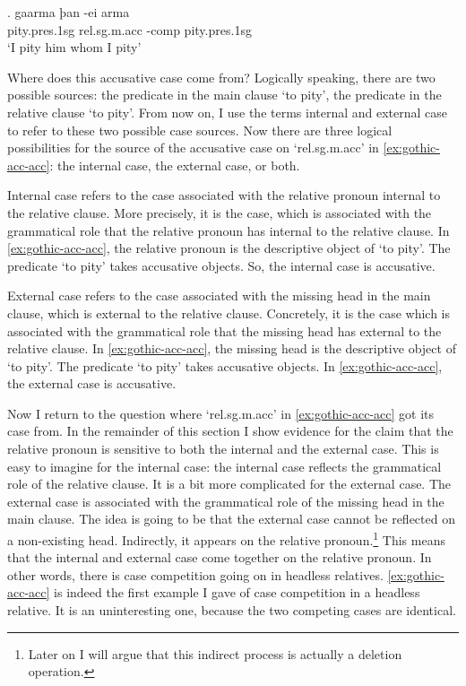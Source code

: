 \exg. gaarma þan -ei arma\\
 pity.\ac{pres}.1\ac{sg}\scsub{[acc]} \ac{rel}.\ac{sg}.\ac{m}.\ac{acc} -\ac{comp} pity.\ac{pres}.1\ac{sg}\scsub{[acc]}\\
 `I pity him whom I pity' \label{ex:gothic-acc-acc}

Where does this accusative case come from? Logically speaking, there are two possible sources: the predicate in the main clause  `to pity', the predicate in the relative clause  `to pity'. From now on, I use the terms internal and external case to refer to these two possible case sources. Now there are three logical possibilities for the source of the accusative case on  `\ac{rel}.\ac{sg}.\ac{m}.\ac{acc}' in \ref{ex:gothic-acc-acc}: the internal case, the external case, or both.

Internal case refers to the case associated with the relative pronoun internal to the relative clause. More precisely, it is the case, which is associated with the grammatical role that the relative pronoun has internal to the relative clause. In \ref{ex:gothic-acc-acc}, the relative pronoun is the descriptive object of  `to pity'. The predicate  `to pity' takes accusative objects. So, the internal case is accusative.

External case refers to the case associated with the missing head in the main clause, which is external to the relative clause. Concretely, it is the case which is associated with the grammatical role that the missing head has external to the relative clause. In \ref{ex:gothic-acc-acc}, the missing head is the descriptive object of  `to pity'. The predicate  `to pity' takes accusative objects. In \ref{ex:gothic-acc-acc}, the external case is accusative.

Now I return to the question where  `\ac{rel}.\ac{sg}.\ac{m}.\ac{acc}' in \ref{ex:gothic-acc-acc} got its case from. In the remainder of this section I show evidence for the claim that the relative pronoun is sensitive to both the internal and the external case.
This is easy to imagine for the internal case: the internal case reflects the grammatical role of the relative clause. It is a bit more complicated for the external case. The external case is associated with the grammatical role of the missing head in the main clause. The idea is going to be that the external case cannot be reflected on a non-existing head. Indirectly, it appears on the relative pronoun.\footnote{
Later on I will argue that this indirect process is actually a deletion operation.
}
This means that the internal and external case come together on the relative pronoun. In other words, there is case competition going on in headless relatives. \ref{ex:gothic-acc-acc} is indeed the first example I gave of case competition in a headless relative. It is an uninteresting one, because the two competing cases are identical.

